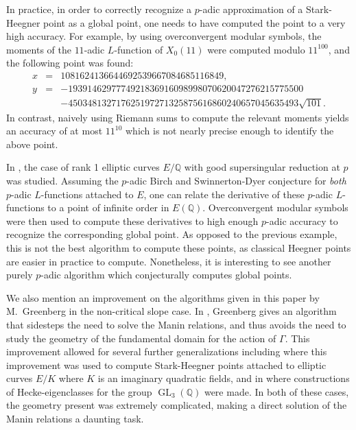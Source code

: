 \documentclass{amsart}
\theoremstyle{plain}
\theoremstyle{definition}
\newcommand{\Q}{{\mathbb Q}}
\DeclareMathOperator{\GL}{GL}
\begin{document}
In practice, in order to correctly recognize a $p$-adic approximation of a Stark-Heegner point as a global point, one needs to have computed the point to a very high accuracy.  For example, by using overconvergent modular symbols, the moments of the $11$-adic $L$-function of $X_0(11)$ were computed modulo $11^{100}$, and the  following point was found:
\begin{eqnarray*}
x &=& 
1081624136644692539667084685116849, \\
y &=& -1939146297774921836916098998070620047276215775500 \\
& & -450348132717625197271325875616860240657045635493 \sqrt{101}.
\end{eqnarray*}
In contrast, naively using Riemann sums to compute the relevant moments yields an accuracy of at most $11^{10}$ which is not nearly precise enough to identify the above point.  

In \cite{KP}, the case of rank 1 elliptic curves $E/\Q$ with good supersingular reduction at $p$ was studied.    Assuming the $p$-adic Birch and Swinnerton-Dyer conjecture for {\it both} $p$-adic $L$-functions attached to $E$, one can relate the derivative of these $p$-adic $L$-functions to a point of infinite order in $E(\Q)$.  Overconvergent modular symbols were then used to compute these derivatives to high enough $p$-adic accuracy to recognize the corresponding global point.  As opposed to the previous example, this is not the best algorithm to compute these points, as classical Heegner points are easier in practice to compute.  Nonetheless, it is interesting to see another purely $p$-adic algorithm which conjecturally computes global points.  


We also mention an improvement on the algorithms given in this paper by M.\ Greenberg in the non-critical slope case.  In \cite{MG}, Greenberg gives an algorithm that sidesteps the need to solve the Manin relations, and thus avoids the need to study the geometry of the fundamental domain for the action of $\Gamma$.  This improvement allowed for several further generalizations including \cite{Mak} where this improvement was used to compute Stark-Heegner points attached to elliptic curves $E/K$ where $K$ is an imaginary quadratic fields, and in \cite{PP} where constructions of Hecke-eigenclasses for the group $\GL_3(\Q)$ were made.  In both of these cases, the geometry present was extremely complicated, making a direct solution of the Manin relations a daunting task.
\end{document}
